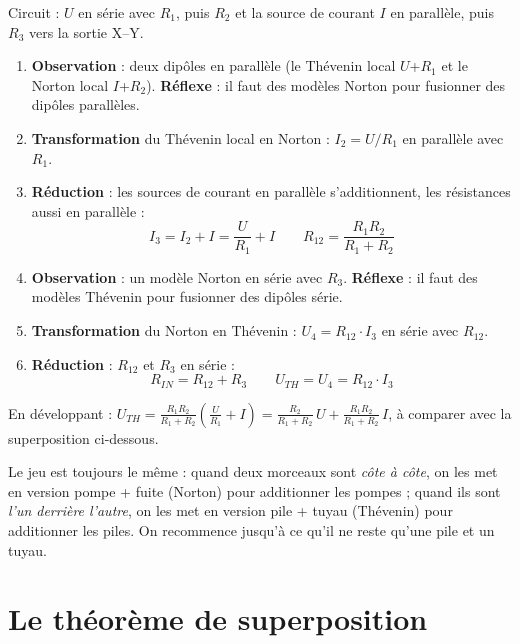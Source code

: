 
\begin{exbox}[title={Montage 2 : transformations en alternance}]
Circuit : $U$ en série avec $R_1$, puis $R_2$ et la source de courant $I$ en parallèle, puis
$R_3$ vers la sortie X--Y.
\begin{enumerate}
  \item \textbf{Observation} : deux dipôles en parallèle (le \og Thévenin local\fg{} $U$+$R_1$
        et le \og Norton local\fg{} $I$+$R_2$). \textbf{Réflexe} : il faut des modèles Norton
        pour fusionner des dipôles parallèles.
  \item \textbf{Transformation} du Thévenin local en Norton : $I_2 = U/R_1$ en parallèle avec
        $R_1$.
  \item \textbf{Réduction} : les sources de courant en parallèle s'additionnent, les
        résistances aussi en parallèle :
        \[ I_3 = I_2 + I = \frac{U}{R_1} + I \qquad R_{12} = \frac{R_1 R_2}{R_1 + R_2} \]
  \item \textbf{Observation} : un modèle Norton en série avec $R_3$. \textbf{Réflexe} : il
        faut des modèles Thévenin pour fusionner des dipôles série.
  \item \textbf{Transformation} du Norton en Thévenin : $U_4 = R_{12}\cdot I_3$ en série avec
        $R_{12}$.
  \item \textbf{Réduction} : $R_{12}$ et $R_3$ en série :
        \[ R_{IN} = R_{12} + R_3 \qquad U_{TH} = U_4 = R_{12}\cdot I_3 \]
\end{enumerate}
En développant :
$U_{TH} = \frac{R_1 R_2}{R_1+R_2}\left(\frac U{R_1} + I\right)
        = \frac{R_2}{R_1+R_2}\,U + \frac{R_1R_2}{R_1+R_2}\,I$,
à comparer avec la superposition ci-dessous.
\end{exbox}

\begin{goatbox}
Le jeu est toujours le même : quand deux morceaux sont \emph{côte à côte}, on les met en
version \og pompe + fuite\fg{} (Norton) pour additionner les pompes ; quand ils sont
\emph{l'un derrière l'autre}, on les met en version \og pile + tuyau\fg{} (Thévenin) pour
additionner les piles. On recommence jusqu'à ce qu'il ne reste qu'une pile et un tuyau.
\end{goatbox}

\section{Le théorème de superposition}

